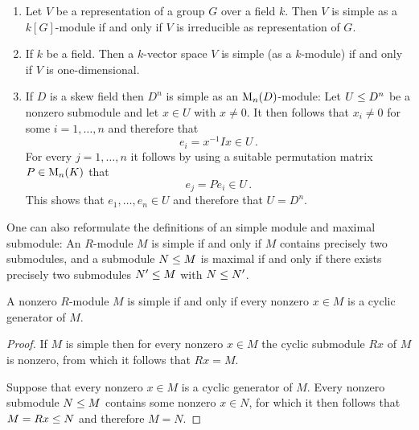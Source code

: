 \begin{example}
  \leavevmode
  \begin{enumerate}
    \item
      Let $V$ be a representation of a group $G$ over a field $k$.
      Then $V$ is simple as a $k[G]$-module if and only if $V$ is irreducible as representation of $G$.
    \item
      If $k$ be a field.
      Then a $k$-vector space $V$ is simple (as a $k$-module) if and only if $V$ is one-dimensional.
    \item
      If $D$ is a skew field then $D^n$ is simple as an $\operatorname{M}_n(D)$-module:
      Let $U \leq D^n$ be a nonzero submodule and let $x \in U$ with $x \neq 0$.
      It then follows that $x_i \neq 0$ for some $i = 1, \dotsc, n$ and therefore that
      \[
            e_i
        =   x^{-1} I x
        \in U \,.
      \]
      For every $j = 1, \dotsc, n$ it follows by using a suitable permutation matrix $P \in \operatorname{M}_n(K)$ that
      \[
            e_j
        =   P e_i
        \in U \,.
      \]
      This shows that $e_1, \dotsc, e_n \in U$ and therefore that $U = D^n$.
  \end{enumerate}
\end{example}


\begin{remark}
  \label{remark: alternative formulation of simple and maximal}
  One can also reformulate the definitions of an simple module and maximal submodule:
  An $R$-module $M$ is simple if and only if $M$ contains precisely two submodules, and a submodule $N \leq M$ is maximal if and only if there exists precisely two submodules $N' \leq M$ with $N \leq N'$.
\end{remark}


\begin{lemma}
  \label{lemma: simple iff every cyclic generator}
  A nonzero $R$-module $M$ is simple if and only if every nonzero $x \in M$ is a cyclic generator of $M$. 
\end{lemma}


\begin{proof}
  If $M$ is simple then for every nonzero $x \in M$ the cyclic submodule $Rx$ of $M$ is nonzero, from which it follows that $Rx = M$.
  
  Suppose that every nonzero $x \in M$ is a cyclic generator of $M$.
  Every nonzero submodule $N \leq M$ contains some nonzero $x \in N$, for which it then follows that $M = Rx \leq N$ and therefore $M = N$.
\end{proof}


